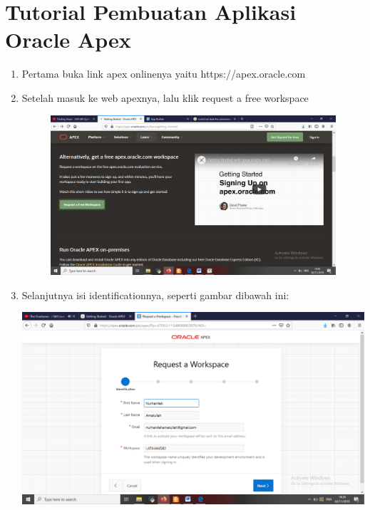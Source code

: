 \chapter*{Tutorial Pembuatan Aplikasi Oracle Apex}

\begin{enumerate}
	\item Pertama buka link apex onlinenya yaitu  https://apex.oracle.com

	\item Setelah masuk ke web apexnya, lalu klik request a free workspace 
    \begin{figure}[!htbp]
    \begin{center}
    \includegraphics[scale=0.2]{Apex/0.png}
    \end{center}   
    \end{figure}
    
	\item Selanjutnya isi identificationnya, seperti gambar dibawah ini: 
	\begin{center}
    \includegraphics[scale=0.2]{Apex/1.png}
    \end{center}
    

\end{enumerate}
